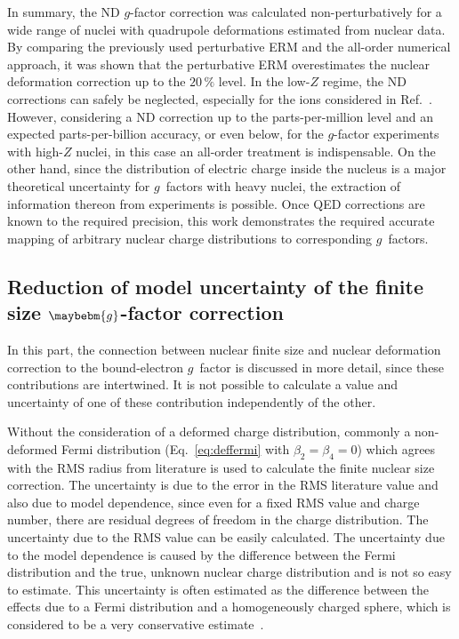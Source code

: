In summary, the ND $g$-factor correction was calculated non-perturbatively for a wide range of nuclei with quadrupole deformations estimated from nuclear data.
By comparing the previously used perturbative ERM and the all-order numerical approach, it was shown that the perturbative ERM overestimates the nuclear deformation correction up to the $20\,\%$ level.
In the low-$Z$ regime, the ND corrections can safely be neglected, especially for the ions considered in Ref.~\cite{Sturm2014}. However, considering a ND correction up to the parts-per-million level and an expected parts-per-billion accuracy, or even below, for the $g$-factor experiments with high-$Z$ nuclei, in this case an all-order treatment is indispensable. 
On the other hand, since the distribution of electric charge inside the nucleus is a major theoretical uncertainty for $g$~factors with heavy nuclei, the extraction of information thereon from experiments is possible. Once QED corrections are known to the required precision, this work demonstrates the required accurate mapping of arbitrary nuclear charge distributions to corresponding $g$~factors.\\[0.6cm]

\subsection{Reduction of model uncertainty of the finite size $\maybebm{g}$-factor correction}
In this part, the connection between nuclear finite size and nuclear deformation correction to the bound-electron $g$~factor is discussed in more detail, since these contributions are intertwined. It is not possible to calculate a value and uncertainty of one of these contribution independently of the other.

Without the consideration of a deformed charge distribution, commonly a non-deformed Fermi distribution (Eq.~\eqref{eq:deffermi} with ${\beta_2}{=}{\beta_4}{=}0$) which agrees with the RMS radius from literature is used to calculate the finite nuclear size correction. 
The uncertainty is due to the error in the RMS literature value and also due to model dependence, since even for a fixed RMS value and charge number, there are residual degrees of freedom in the charge distribution. The uncertainty due to the RMS value can be easily calculated. The uncertainty due to the model dependence is caused by the difference between the Fermi distribution and the true, unknown nuclear charge distribution and is not so easy to estimate. This uncertainty is often estimated as the difference between the effects due to a Fermi distribution and a homogeneously charged sphere, which is considered to be a very conservative estimate~\cite{Shabaev2006}.

